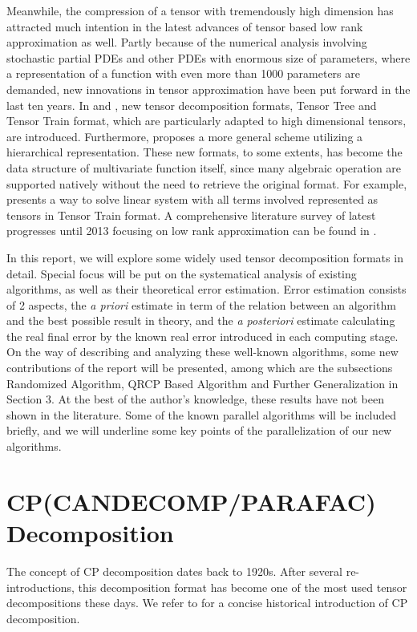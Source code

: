 \documentclass[12pt]{article}
\begin{document}
Meanwhile, the compression of a tensor with tremendously high dimension has attracted much intention in the latest advances of tensor based low rank approximation as well. Partly because of the numerical analysis involving stochastic partial PDEs and other PDEs with enormous size of parameters, where a representation of a function with even more than 1000 parameters are demanded, new innovations in tensor approximation have been put forward in the last ten years. In \cite{ttree} and \cite{ttrain}, new tensor decomposition formats, Tensor Tree and Tensor Train format, which are particularly adapted to high dimensional tensors, are introduced. Furthermore, \cite{thiera} proposes a more general scheme utilizing a hierarchical representation. These new formats, to some extents, has become the data structure of multivariate function itself, since many algebraic operation are supported natively without the need to retrieve the original format. For example, \cite{ttrainsolve} presents a way to solve linear system with all terms involved represented as tensors in Tensor Train format. A comprehensive literature survey of latest progresses until 2013 focusing on low rank approximation can be found in \cite{lowranklit}. 

In this report, we will explore some widely used tensor decomposition formats in detail. Special focus will be put on the systematical analysis of existing algorithms, as well as their theoretical error estimation. Error estimation consists of 2 aspects, the \textit{a priori} estimate in term of the relation between an algorithm and the best possible result in theory, and the \textit{a posteriori} estimate calculating the real final error by the known real error introduced in each computing stage. On the way of describing and analyzing these well-known algorithms, some new contributions of the report will be presented, among which are the subsections Randomized Algorithm, QRCP Based Algorithm and Further Generalization in Section 3. At the best of the author's knowledge, these results have not been shown in the literature. Some of the known parallel algorithms will be included briefly, and we will underline some key points of the parallelization of our new algorithms.




\section{CP(CANDECOMP/PARAFAC) Decomposition}

The concept of CP decomposition dates back to 1920s. After several re-introductions, this decomposition format has become one of the most used tensor decompositions these days. We refer to \cite{koldaapp} for a concise historical introduction of CP decomposition. 
\end{document}
